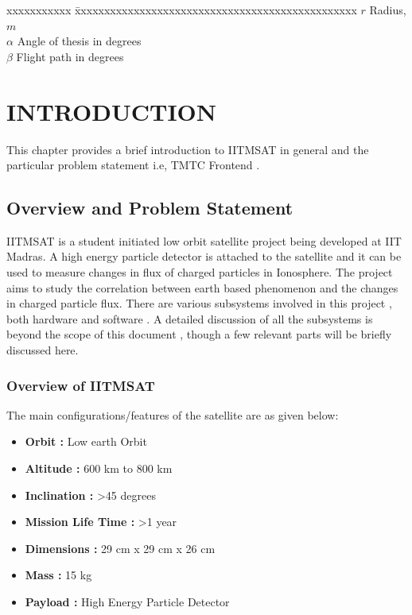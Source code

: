 \documentclass[BTech]{iitmdiss}
\begin{document}
 \begin{singlespace}
 \begin{tabbing}
 xxxxxxxxxxx \= xxxxxxxxxxxxxxxxxxxxxxxxxxxxxxxxxxxxxxxxxxxxxxxx \kill
 \textbf{$r$}  \> Radius, $m$ \\
 \textbf{$\alpha$}  \> Angle of thesis in degrees \\
 \textbf{$\beta$}   \> Flight path in degrees \\
 \end{tabbing}
 \end{singlespace}
 
 \pagebreak
 \clearpage




 \chapter{INTRODUCTION}
 \label{chap:intro}
 
\par This chapter provides a brief introduction to IITMSAT in general and the particular problem statement i.e, TMTC Frontend .
 
 \section{Overview and Problem Statement}
 IITMSAT is a student initiated low orbit satellite project being developed at IIT Madras. A high energy particle detector is attached to the satellite and it can be used to measure changes in flux of charged particles in Ionosphere. The project aims to study the correlation between earth based phenomenon and the changes in charged particle flux. There are various subsystems involved in this project , both hardware and software . A detailed discussion of all the subsystems is beyond the scope of this document , though a few relevant parts will be briefly discussed here.   

\subsection {Overview of IITMSAT }
The main configurations/features of the satellite are as given below:
\begin{itemize}

\item \textbf{Orbit : } Low earth Orbit
\item \textbf{Altitude : } 600 km to 800 km
\item \textbf{Inclination : } \textgreater  45 degrees 
\item \textbf{Mission Life Time : } \textgreater 1 year 
\item \textbf{Dimensions : }  29 cm x 29 cm x 26 cm
\item \textbf{Mass : } 15 kg
\item \textbf{Payload : } High Energy Particle Detector 
\end{itemize}
 
\end{document}
